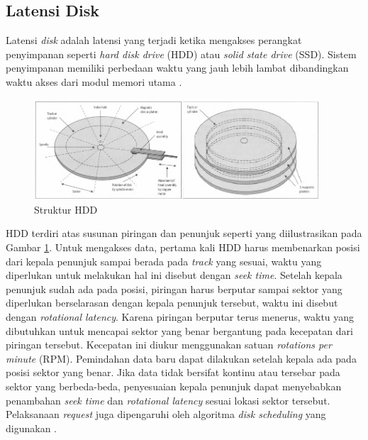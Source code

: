\subsection{Latensi Disk}
\label{sec:latensi-disk}

Latensi \textit{disk} adalah latensi yang terjadi ketika mengakses perangkat penyimpanan seperti \textit{hard disk drive} (HDD) atau \textit{solid state drive} (SSD). Sistem penyimpanan memiliki perbedaan waktu yang jauh lebih lambat dibandingkan waktu akses dari modul memori utama \parencite{ng1991improving}.

\begin{figure}[ht]
  \centering
  \includegraphics[width=0.95\textwidth]{resources/chapter-2/disk-structure.png}
  \caption{Struktur HDD \parencite{sammes2000disk}}
  \label{fig:hdd-structure}
\end{figure}


HDD terdiri atas susunan piringan dan penunjuk seperti yang diilustrasikan pada Gambar \ref{fig:hdd-structure}. Untuk mengakses data, pertama kali HDD harus membenarkan posisi dari kepala penunjuk sampai berada pada \textit{track} yang sesuai, waktu yang diperlukan untuk melakukan hal ini disebut dengan \textit{seek time}. Setelah kepala penunjuk sudah ada pada posisi, piringan harus berputar sampai sektor yang diperlukan berselarasan dengan kepala penunjuk tersebut, waktu ini disebut dengan \textit{rotational latency}. Karena piringan berputar terus menerus, waktu yang dibutuhkan untuk mencapai sektor yang benar bergantung pada kecepatan dari piringan tersebut. Kecepatan ini diukur menggunakan satuan \textit{rotations per minute} (RPM). Pemindahan data baru dapat dilakukan setelah kepala ada pada posisi sektor yang benar. Jika data tidak bersifat kontinu atau tersebar pada sektor yang berbeda-beda, penyesuaian kepala penunjuk dapat menyebabkan penambahan \textit{seek time} dan \textit{rotational latency} sesuai lokasi sektor tersebut. Pelaksanaan \textit{request} juga dipengaruhi oleh algoritma \textit{disk scheduling} yang digunakan \parencite{arpaci2018operating}.

